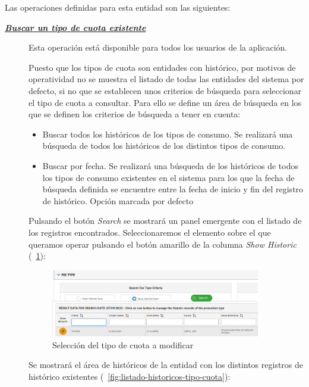Las operaciones definidas para esta entidad son las siguientes:
\begin{description}
\item[\underline{\textsl{\textbf{Buscar un tipo de cuota existente}}}] Esta operación está disponible para todos los usuarios de la aplicación.

Puesto que los tipos de cuota son entidades con histórico, por motivos de operatividad no se muestra el listado de todas las entidades del sistema por defecto, si no que se establecen unos criterios de búsqueda para seleccionar el tipo de cuota a consultar. Para ello se define un área de búsqueda en los que se definen los criterios de búsqueda a tener en cuenta:
\begin{itemize}
\item Buscar todos los históricos de los tipos de consumo. Se realizará una búsqueda de todos los históricos de los distintos tipos de consumo.
\item Buscar por fecha. Se realizará una búsqueda de los históricos de todos los tipos de consumo existentes en el sistema para los que la fecha de búsqueda definida se encuentre entre la fecha de inicio y fin del registro de histórico. Opción marcada por defecto
\end{itemize}

Pulsando el botón \emph{Search} se mostrará un panel emergente con el listado de los registros encontrados. Seleccionaremos el elemento sobre el que queramos operar pulsando el botón amarillo de la columna \emph{Show Historic} (\figurename~\ref{fig:seleccion-tipo-cuota}):

\begin{figure}[H]
  \centering
  \includegraphics[width=0.90\textwidth]{imaxes/seleccion-tipo-cuota.png}
  \caption{Selección del tipo de cuota a modificar}
  \label{fig:seleccion-tipo-cuota}
\end{figure}


Se mostrará el área de históricos de la entidad con los distintos registros de histórico existentes (\figurename~\ref{fig:listado-historicos-tipo-cuota}):


\end{description}

